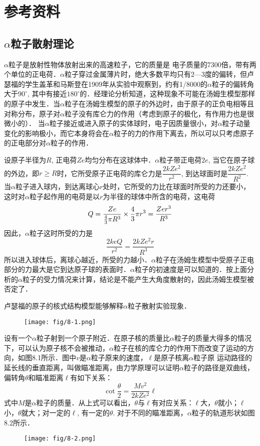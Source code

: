\section{参考资料}

\subsection{$\alpha$粒子散射理论}

$\alpha$粒子是放射性物体放射出来的高速粒子，它的质量是
电子质量的7300倍，带有两个单位的正电荷．$\alpha$粒子穿过金属薄片时，绝大多数平均只有2—3度的偏转，但卢瑟福的学生盖革和马斯登在1909年从实验中观察到，约有1/8000的$\alpha$粒子的偏转角大于$90^{\circ}$, 其中有接近$180^{\circ}$的．经理论分析知道，这种现象不可能在汤姆生模型那样的原子中发生．当$\alpha$粒子在汤姆生模型的原子的外边时，由于原子的正负电相等且对称分布，原子对$\alpha$粒子没有库仑力的作用（考虑到原子的极化，有作用力也是很微小的）． 当$\alpha$粒子接近或进入原子的实体球时，电子因质量很小，对$\alpha$粒子动量变化的影响极小，而它本身将会在$\alpha$粒子的力的作用下离去，所以可以只考虑原子的正电部分对$\alpha$粒子的作用．

设原子半径为$R$, 正电荷$Ze$均匀分布在这球体中．$\alpha$粒子带正电荷$2e$, 当它在原子球的外边，即$r\ge R$时，它所受原子正电荷的库仑力是$\dfrac{2kZe^2}{r^2}$, 到达球面时是$\dfrac{2kZe^2}{R^2}$. 当$\alpha$粒子进入球内，到达离球心$r$处时，它所受的力比在球面时所受的力还要小，这时对$\alpha$粒子起作用的电荷是以$r$为半径的球体中所含的电荷，这电荷
\[Q=\frac{Ze}{\frac{4}{3}\pi R^3}\times \frac{4}{3}\pi r^3=\frac{Zer^3}{R^3}\]
因此，$\alpha$粒子这时所受的力是
\[\frac{2keQ}{r^2}=\frac{2kZe^2r}{R^3}\]
所以进入球体后，离球心越近，所受的力越小．$\alpha$粒子在汤姆生模型中受原子正电部分的力最大是它到达原子球的表面时．$\alpha$粒子的初速度是可以知道的．按上面分析的$\alpha$粒子的受力情况来计算，结论是不能产生大角度散射的，因此汤姆生模型被否定了．

卢瑟福的原子的核式结构模型能够解释$\alpha$粒子散射实验现象．

\begin{figure}[htp]
    \centering
   \texttt{[image: fig/8-1.png]}
    \caption{}
\end{figure}

设有一个$\alpha$粒子射到一个原子附近．在原子核的质量比$\alpha$粒子的质量大得多的情况下，可以认为原子核不会被推动，$\alpha$粒子在核的库仑力的作用下而改变了运动的方向，如图8.1所示．图中$v$是$\alpha$粒子原来的速度，$\ell$是原子核离$\alpha$粒子原
运动路径的延长线的垂直距离，叫做瞄准距离，由力学原理可以证明$\alpha$粒子的路径是双曲线，偏转角$\theta$和瞄准距离$\ell$有如下关系：
\begin{equation}
    \cot\frac{\theta}{2}=\frac{Mv^2}{2kZe^2}\ell
\end{equation}
式中$M$是$\alpha$粒子的质量．从上式可以看出，$\theta$与$\ell$有对应关系：$\ell$大，$\theta$就小；$\ell$小，$\theta$就大；对一定的$\ell$, 有一定的$\theta$. 对于不同的瞄准距离，$\alpha$粒子的轨道形状如图8.2所示．
\begin{figure}[htp]
    \centering
    \texttt{[image: fig/8-2.png]}
    \caption{}
\end{figure}

